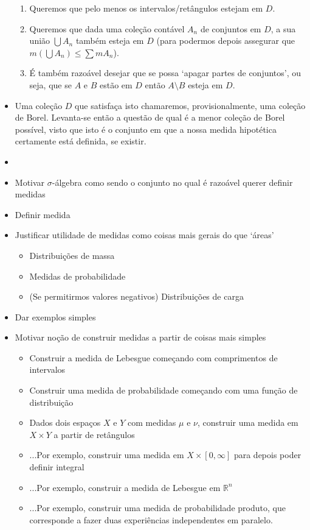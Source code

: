 \documentclass{article}
\newcommand{\R}{\mathbb{R}}
\begin{document}
\begin{itemize}
\begin{enumerate}
\item Queremos que pelo menos os intervalos/retângulos estejam em $D$.
\item Queremos que dada uma coleção contável $A_n$ de conjuntos em $D$, a sua união $\bigcup A_n$ também esteja em $D$ (para podermos depois assegurar que $m(\bigcup A_n) \leq \sum m A_n$).
\item É também razoável desejar que se possa `apagar partes de conjuntos', ou seja, que se $A$ e $B$ estão em $D$ então $A \setminus B$ esteja em $D$.
\end{enumerate}
\item Uma coleção $D$ que satisfaça isto chamaremos, provisionalmente, uma coleção de Borel. Levanta-se então a questão de qual é a menor coleção de Borel possível, visto que isto é o conjunto em que a nossa medida hipotética certamente está definida, se existir.
\item 
\item Motivar $\sigma$-álgebra como sendo o conjunto no qual é razoável querer definir medidas
\item Definir medida
\item Justificar utilidade de medidas como coisas mais gerais do que `áreas'
\begin{itemize}
\item Distribuições de massa
\item Medidas de probabilidade
\item (Se permitirmos valores negativos) Distribuições de carga
\end{itemize}
\item Dar exemplos simples
\item Motivar noção de construir medidas a partir de coisas mais simples
\begin{itemize}
\item Construir a medida de Lebesgue começando com comprimentos de intervalos
\item Construir uma medida de probabilidade começando com uma função de distribuição
\item Dados dois espaços $X$ e $Y$ com medidas $\mu$ e $\nu$, construir uma medida em $X \times Y$ a partir de retângulos
\item ...Por exemplo, construir uma medida em $X \times \left[0,\infty\right]$ para depois poder definir integral
\item ...Por exemplo, construir a medida de Lebesgue em $\R^n$
\item ...Por exemplo, construir uma medida de probabilidade produto, que corresponde a fazer duas experiências independentes em paralelo.
\end{itemize}
\end{itemize}
\end{document}
